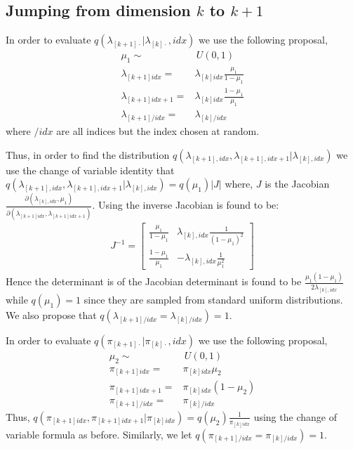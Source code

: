 \documentclass{article}
\begin{document}
\subsection{Jumping from dimension $k$ to $k+1$}
In order to evaluate $q(\lambda_{[k+1]\cdot}|\lambda_{[k]\cdot}, idx)$ we use the following proposal,
\begin{align}
\mu_1\sim & \,U(0,1)\\
\lambda_{[k+1]idx}=&\lambda_{[k]idx}\frac{\mu_1}{1-\mu_1}
\label{eq:lambda_12}\\
\lambda_{[k+1]idx+1}=&\lambda_{[k]idx}\frac{1-\mu_1}{\mu_1}
\label{eq:lambda_22}\\
\lambda_{[k+1]/idx}=&\lambda_{[k]/idx}
\end{align} 
where $/idx$ are all indices but the index chosen at random.

Thus, in order to find the distribution $q(\lambda_{[k+1],idx},\lambda_{[k+1],idx+1}\vert \lambda_{[k],idx})$ we use the change of variable identity that $q(\lambda_{[k+1],idx},\lambda_{[k+1],idx+1}\vert \lambda_{[k],idx})=q(\mu_1)\vert J\vert$ where, $J$ is the Jacobian $\frac{\partial(\lambda_{[k],idx},\mu_1)}{\partial(\lambda_{[k+1]idx},\lambda_{[k+1]idx+1})}$. Using  the inverse Jacobian is found to be:
\begin{align}
J^{-1}=\begin{bmatrix}
\frac{\mu_1}{1-\mu_1} & \lambda_{[k],idx}\frac{1}{(1-\mu_1)^2}\\
\frac{1-\mu_1}{\mu_1} & -\lambda_{[k],idx}\frac{1}{\mu_1^2}
\end{bmatrix}
\end{align}
Hence the determinant is of the Jacobian determinant is found to be $\frac{\mu_1(1-\mu_1)}{2\lambda_{[k],idx}}$ while $q(\mu_1)=1$ since they are sampled from standard uniform distributions. We also propose that $q(\lambda_{[k+1]/idx}=\lambda_{[k]/idx})=1$.

In order to evaluate $q(\pi_{[k+1]\cdot}|\pi_{[k]\cdot}, idx)$ we use the following proposal,
\begin{align}
\mu_2\sim & \,U(0,1)\\
\pi_{[k+1]idx}=&\pi_{[k]idx}\mu_2 \label{eq:pi_12}\\
\pi_{[k+1]idx+1}=&\pi_{[k]idx}(1-\mu_2) \label{eq:pi_22}\\
\pi_{[k+1]/idx}=&\pi_{[k]/idx}
\end{align}
Thus, $q(\pi_{[k+1]idx},\pi_{[k+1]idx+1}|\pi_{[k]idx})=q(\mu_2)\frac{1}{\pi_{[k]idx}}$ using the change of variable formula as before. Similarly, we let $q(\pi_{[k+1]/idx}=\pi_{[k]/idx})=1$.
\end{document}
